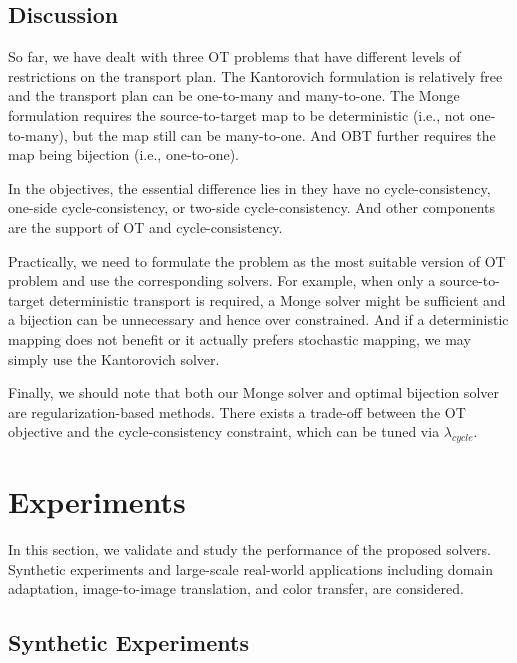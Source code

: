 \documentclass[runningheads]{llncs}
\begin{document}
\subsection{Discussion}

So far, we have dealt with three OT problems that have different levels of restrictions on the transport plan. The Kantorovich formulation is relatively free and the transport plan can be one-to-many and many-to-one. The Monge formulation requires the source-to-target map to be deterministic (i.e., not one-to-many), but the map still can be many-to-one. And OBT further requires the map being bijection (i.e., one-to-one). 

In the objectives, the essential difference lies in they have no cycle-consistency, one-side cycle-consistency, or two-side cycle-consistency. And other components are the support of OT and cycle-consistency. 

Practically, we need to formulate the problem as the most suitable version of OT problem and use the corresponding solvers. For example, when only a source-to-target deterministic transport is required, a Monge solver might be sufficient and a bijection can be unnecessary and hence over constrained. And if a deterministic mapping does not benefit or it actually prefers stochastic mapping, we may simply use the Kantorovich solver. 

Finally, we should note that both our Monge solver and optimal bijection solver are regularization-based methods. There exists a trade-off between the OT objective and the cycle-consistency constraint, which can be tuned via $\lambda_{cycle}$. 

\section{Experiments}
\label{experiments}

In this section, we validate and study the performance of the proposed solvers. Synthetic experiments and large-scale real-world applications including domain adaptation, image-to-image translation, and color transfer, are considered. 

\subsection{Synthetic Experiments}
\label{toy_experiments}
\end{document}
